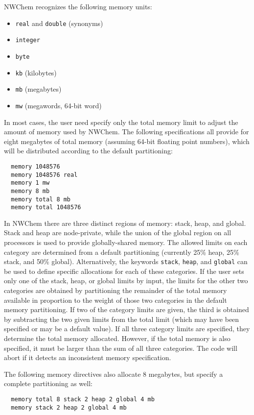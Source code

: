 NWChem recognizes the following memory units:
\begin{itemize}
\item \verb+real+ and \verb+double+ (synonyms)
\item \verb+integer+
\item \verb+byte+
\item \verb+kb+ (kilobytes)
\item \verb+mb+ (megabytes)
\item \verb+mw+ (megawords, 64-bit word)
\end{itemize}

In most cases, the user need specify only the total memory limit to 
adjust the amount of memory used by NWChem. The following specifications 
all provide for eight megabytes of total
memory (assuming 64-bit floating point numbers), which will be
distributed according to the default partitioning:
\begin{verbatim}
  memory 1048576
  memory 1048576 real
  memory 1 mw
  memory 8 mb
  memory total 8 mb
  memory total 1048576
\end{verbatim}

In NWChem there are three distinct regions of memory: stack, heap, 
and global. Stack and heap are node-private, while the union of the 
global region on all processors is used to provide globally-shared memory.  
The allowed limits on each category are determined from a default 
partitioning (currently 25\% heap, 25\% stack, and 50\% global).
Alternatively, the keywords \verb+stack+, \verb+heap+, and
\verb+global+ can be used to define specific allocations for each of
these categories.  If the user sets only one of the stack, heap, or
global limits by input, the limits for the other two categories are
obtained by partitioning the remainder of the total memory available
in proportion to the weight of those two categories in the default
memory partitioning.  If two of the category limits are given, the
third is obtained by subtracting the two given limits from the total
limit (which may have been specified or may be a default value).  If
all three category limits are specified, they determine the total
memory allocated.  However, if the total memory is also specified, it
must be larger than the sum of all three categories.  The code will
abort if it detects an inconsistent memory specification.

The following memory directives also allocate 8 megabytes, but specify
a complete partitioning as well:

\begin{verbatim}
  memory total 8 stack 2 heap 2 global 4 mb
  memory stack 2 heap 2 global 4 mb
\end{verbatim}

